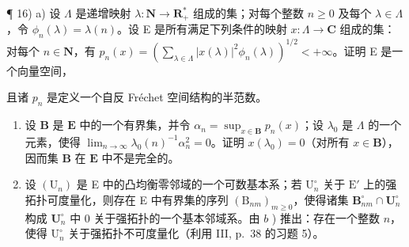 ¶ 16) a) 设 \(\Lambda\) 是递增映射 \(\lambda : \mathbf{N} \to \mathbf{R}_{+}^{*}\) 组成的集；对每个整数 \(n \geqslant 0\) 及每个 \(\lambda \in \Lambda\)，令 \(\phi_{n}(\lambda) = \lambda(n)\)。设 E 是所有满足下列条件的映射 \(x: \Lambda \to \mathbf{C}\) 组成的集：对每个 \(n \in \mathbf{N}\)，有 \(p_{n}(x) = \left( \sum_{\lambda \in \Lambda} |x(\lambda)|^{2} \phi_{n}(\lambda) \right)^{1/2} < +\infty\)。证明 E 是一个向量空间，

且诸 \(p_{n}\) 是定义一个自反 Fréchet 空间结构的半范数。

\begin{enumerate}
\def\labelenumi{\alph{enumi})}
\setcounter{enumi}{1}
\item
  设 \(\mathbf{B}\) 是 \(\mathbf{E}\) 中的一个有界集，并令 \(\alpha_{n} = \sup_{x\in \mathbf{B}}p_{n}(x)\)；设 \(\lambda_0\) 是 \(\Lambda\) 的一个元素，使得 \(\lim_{n\to \infty}\lambda_0(n)^{-1}\alpha_n^2 = 0\)。证明 \(x(\lambda_0) = 0\)（对所有 \(x\in \mathbf{B}\)），因而集 \(\mathbf{B}\) 在 \(\mathbf{E}\) 中不是完全的。
\item
  设 \((\mathrm{U}_n)\) 是 E 中的凸均衡零邻域的一个可数基本系；若 \(\mathrm{U}_n^\circ\) 关于 \(\mathrm{E}'\) 上的强拓扑可度量化，则存在 E 中有界集的序列 \((\mathrm{B}_{nm})_{m\geqslant 0}\)，使得诸集 \(\mathbf{B}_{nm}^{\circ}\cap \mathbf{U}_n^\circ\) 构成 \(\mathbf{U}_n^\circ\) 中 0 关于强拓扑的一个基本邻域系。由 \(b\) ) 推出：存在一个整数 \(n\)，使得 \(\mathrm{U}_n^\circ\) 关于强拓扑不可度量化（利用 III, p.~38 的习题 5）。
\end{enumerate}

\exercisegroup

